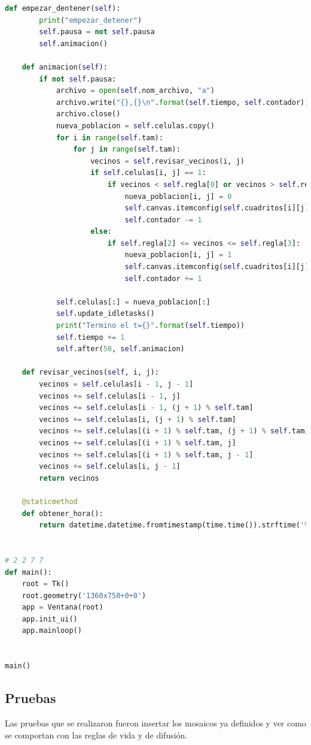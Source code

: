 \begin{lstlisting}[language=Python]
    def empezar_dentener(self):
        print("empezar_detener")
        self.pausa = not self.pausa
        self.animacion()

    def animacion(self):
        if not self.pausa:
            archivo = open(self.nom_archivo, "a")
            archivo.write("{},{}\n".format(self.tiempo, self.contador))
            archivo.close()
            nueva_poblacion = self.celulas.copy()
            for i in range(self.tam):
                for j in range(self.tam):
                    vecinos = self.revisar_vecinos(i, j)
                    if self.celulas[i, j] == 1:
                        if vecinos < self.regla[0] or vecinos > self.regla[1]:
                            nueva_poblacion[i, j] = 0
                            self.canvas.itemconfig(self.cuadritos[i][j], fill=self.ceros)
                            self.contador -= 1
                    else:
                        if self.regla[2] <= vecinos <= self.regla[3]:
                            nueva_poblacion[i, j] = 1
                            self.canvas.itemconfig(self.cuadritos[i][j], fill=self.unos)
                            self.contador += 1

            self.celulas[:] = nueva_poblacion[:]
            self.update_idletasks()
            print("Termino el t={}".format(self.tiempo))
            self.tiempo += 1
            self.after(50, self.animacion)

    def revisar_vecinos(self, i, j):
        vecinos = self.celulas[i - 1, j - 1]
        vecinos += self.celulas[i - 1, j]
        vecinos += self.celulas[i - 1, (j + 1) % self.tam]
        vecinos += self.celulas[i, (j + 1) % self.tam]
        vecinos += self.celulas[(i + 1) % self.tam, (j + 1) % self.tam]
        vecinos += self.celulas[(i + 1) % self.tam, j]
        vecinos += self.celulas[(i + 1) % self.tam, j - 1]
        vecinos += self.celulas[i, j - 1]
        return vecinos

    @staticmethod
    def obtener_hora():
        return datetime.datetime.fromtimestamp(time.time()).strftime('%Y-%m-%d_%H:%M:%S')


# 2 2 7 7
def main():
    root = Tk()
    root.geometry('1360x750+0+0')
    app = Ventana(root)
    app.init_ui()
    app.mainloop()


main()

\end{lstlisting}

\subsection{Pruebas}
Las pruebas que se realizaron fueron insertar los mosaicos ya definidos y ver como se comportan con las reglas de vida y de difusión.


